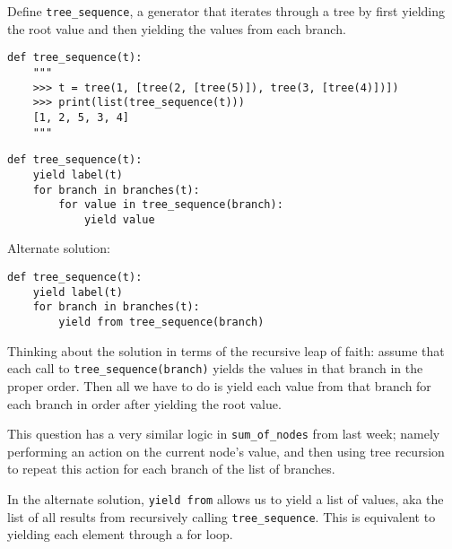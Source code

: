 \begin{blocksection}
\question Define \lstinline$tree_sequence$, a generator that iterates through a tree by first yielding the root value and then yielding the values from each branch.

\begin{lstlisting}
def tree_sequence(t):
    """
    >>> t = tree(1, [tree(2, [tree(5)]), tree(3, [tree(4)])])
    >>> print(list(tree_sequence(t)))
    [1, 2, 5, 3, 4]
    """
\end{lstlisting}

\begin{solution}[1.5in]
\begin{lstlisting}
def tree_sequence(t):
    yield label(t)
    for branch in branches(t):
        for value in tree_sequence(branch):
            yield value
\end{lstlisting}
Alternate solution:
\begin{lstlisting}
def tree_sequence(t):
    yield label(t)
    for branch in branches(t):
        yield from tree_sequence(branch)
\end{lstlisting}
Thinking about the solution in terms of the recursive leap of faith: assume that each call to \lstinline{tree_sequence(branch)} yields the values in that branch in the proper order. Then all we have to do is yield each value from that branch for each branch in order after yielding the root value. 

This question has a very similar logic in \lstinline{sum_of_nodes} from last week; namely performing an action on the current node’s value, and then using tree recursion to repeat this action for each branch of the list of branches.

In the alternate solution, \lstinline{yield from} allows us to yield a list of values, aka the list of all results from recursively calling \lstinline{tree_sequence}. This is equivalent to yielding each element through a for loop.
\end{solution}


\end{blocksection}
